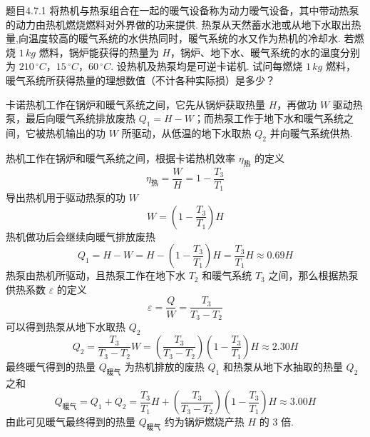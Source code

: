 \begin{question}{题目4.7.1}
    将热机与热泵组合在一起的暖气设备称为动力暧气设备，其中带动热泵的动力由热机燃烧燃料对外界做的功来提供. 热泵从天然蓄水池或从地下水取出热量,向温度较高的暖气系统的水供热同时，暖气系统的水又作为热机的冷却水. 若燃烧 $1 \,\si{kg}$ 燃料，锅炉能获得的热量为 $H$，锅炉、地下水、暖气系统的水的温度分别为 $210 \,\si{^\circ C}$，$15 \,\si{^\circ C}$，$60 \,\si{^\circ C}$. 设热机及热泵均是可逆卡诺机. 试问每燃烧 $1 \,\si{kg}$ 燃料，暖气系统所获得热量的理想数值（不计各种实际损）是多少？
\end{question}
\begin{solution}
    卡诺热机工作在锅炉和暖气系统之间，它先从锅炉获取热量 $H$，再做功 $W$ 驱动热泵，最后向暖气系统排放废热 $Q_1 = H - W$；而热泵工作于地下水和暖气系统之间，它被热机输出的功 $W$ 所驱动，从低温的地下水取热 $Q_2$ 并向暖气系统供热.

    热机工作在锅炉和暖气系统之间，根据卡诺热机效率 $\eta_\text{热}$ 的定义
    $$
        \eta_\text{热} = \frac{W}{H} = 1 - \frac{T_3}{T_1}
    $$
    导出热机用于驱动热泵的功 $W$
    $$
        W = \left(1-\frac{T_3}{T_1}\right) H
    $$
    热机做功后会继续向暖气排放废热
    $$
        Q_1 = H-W
        = H - \left(1 - \frac{T_3}{T_1} \right) H
        = \frac{T_3}{T_1}H
        \approx 0.69H
    $$
    热泵由热机所驱动，且热泵工作在地下水 $T_2$ 和暖气系统 $T_3$ 之间，那么根据热泵供热系数 $\varepsilon$ 的定义
    $$
        \varepsilon = \frac{Q}{W} = \frac{T_3}{T_3 - T_2}
    $$
    可以得到热泵从地下水取热 $Q_2$
    $$
        Q_2 = \frac{T_3}{T_3 - T_2} W
        = \left(\frac{T_3}{T_3 - T_2}\right) \left(1 - \frac{T_3}{T_1}\right) H
        \approx 2.30H
    $$
    最终暖气得到的热量 $Q_\text{暖气}$ 为热机排放的废热 $Q_1$ 和热泵从地下水抽取的热量 $Q_2$ 之和
    $$
        Q_\text{暖气} = Q_1 + Q_2
        = \frac{T_3}{T_1}H + \left(\frac{T_3}{T_3 - T_2}\right) \left(1 - \frac{T_3}{T_1}\right) H
        \approx 3.00H
    $$
    由此可见暖气最终得到的热量 $Q_\text{暖气}$ 约为锅炉燃烧产热 $H$ 的 3 倍.
\end{solution}